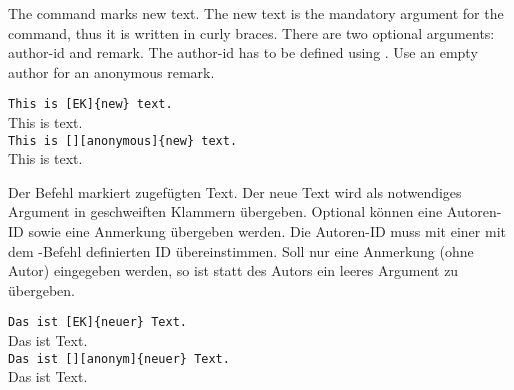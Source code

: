\subsubsection{}
\DescribeMacro{\added}
\ifENGLISH
The command  marks new text.
The new text is the mandatory argument for the command, thus it is written in curly braces.
There are two optional arguments: author-id and remark.
The author-id has to be defined using .
Use an empty author for an anonymous remark.
\begin{chusage}
\>
\end{chusage}
\begin{chusage}[true]
\>\texttt{This is [EK]\{new\} text.}\\
\>This is  text.\\
\>\texttt{This is [][anonymous]\{new\} text.}\\
\>This is  text.
\end{chusage}
\fi
\ifGERMAN
	Der Befehl  markiert zugefügten Text.
	Der neue Text wird als notwendiges Argument in geschweiften Klammern übergeben.
	Optional können eine Autoren-ID sowie eine Anmerkung übergeben werden.
	Die Autoren-ID muss mit einer mit dem -Befehl definierten ID übereinstimmen.
	Soll nur eine Anmerkung (ohne Autor) eingegeben werden, so ist statt des Autors ein leeres Argument zu übergeben.
	\begin{chusage}
	\>
	\end{chusage}
	\begin{chusage}[true]
	\>\texttt{Das ist [EK]\{neuer\} Text.}\\
	\>Das ist  Text.\\
	\>\texttt{Das ist [][anonym]\{neuer\} Text.}\\
	\>Das ist  Text.
	\end{chusage}
\fi

